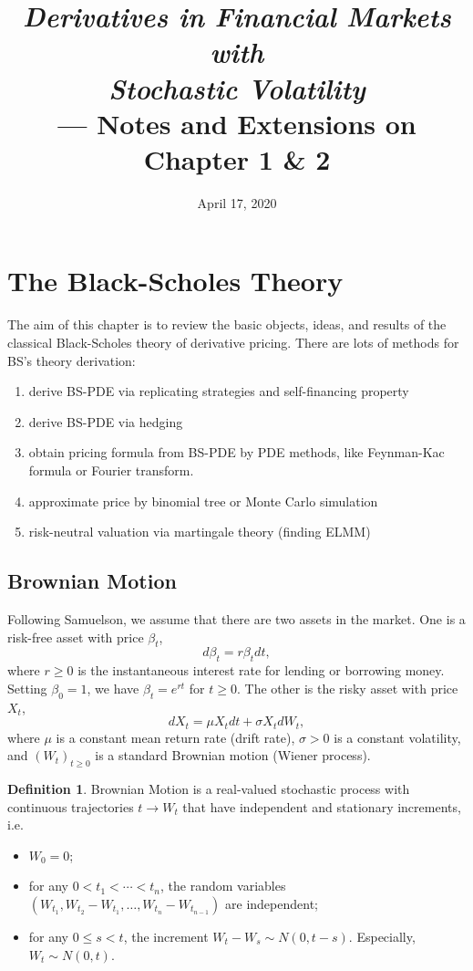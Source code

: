 \documentclass[a4paper,12pt]{article}
\title{
    \textit{Derivatives in Financial Markets with \\
    Stochastic Volatility} \\
    --- Notes and Extensions on Chapter 1 \& 2
}
\author{ }
\date{April 17, 2020}
\numberwithin{equation}{section}
\theoremstyle{definition}
\newtheorem{definition}{Definition}[section]
\theoremstyle{remark}
\begin{document}
\maketitle
\tableofcontents\newpage

\section{The Black-Scholes Theory}
The aim of this chapter is to review the basic objects, ideas, 
and results of the classical Black-Scholes theory of derivative 
pricing. There are lots of methods for BS's theory derivation: 
\begin{enumerate}
    \item derive BS-PDE via replicating strategies 
    and self-financing property
    \item derive BS-PDE via hedging
    \item obtain pricing formula from BS-PDE by PDE methods, like 
    Feynman-Kac formula or Fourier transform.
    \item approximate price by binomial tree or Monte Carlo simulation
    \item risk-neutral valuation via martingale theory (finding ELMM)
\end{enumerate}

\subsection{Brownian Motion}
Following Samuelson, we assume that there are two assets in the 
market. One is a risk-free asset with price $\beta_t$, 
\begin{equation}
\label{eq:riskless_price}
    d \beta_{t} = r \beta_{t} dt,
\end{equation}
where $r \geq 0$ is the instantaneous interest rate for lending 
or borrowing money. Setting $\beta_{0} = 1$, we have 
$\beta_{t} = e^{rt}$ for $t \geq 0$. The other is the risky asset 
with price $X_t$, 
\begin{equation}
\label{eq:risky_price}
    d X_{t} = \mu X_{t} dt + \sigma X_{t} dW_{t},
\end{equation}
where $\mu$ is a constant mean return rate (drift rate), 
$\sigma > 0$ is a constant volatility, and $(W_{t})_{t\geq 0}$ 
is a standard Brownian motion (Wiener process).

\begin{definition}
\label{def:bm}
Brownian Motion is a real-valued stochastic process with 
continuous trajectories $t \rightarrow W_t$ that have 
independent and stationary increments, i.e. 
\begin{itemize}
    \item $W_{0} = 0$;
    \item for any $0<t_1 <\cdots< t_n$, the random variables 
    $\left(W_{t_1},W_{t_2}-W_{t_1},\dots,W_{t_n}-W_{t_{n-1}}\right)$ 
    are independent;
    \item for any $0\leq s<t$, the increment 
    $W_{t}-W_{s}\sim N(0,t-s)$. Especially, $W_{t} \sim N(0,t)$.
\end{itemize}
\end{definition}
\end{document}
